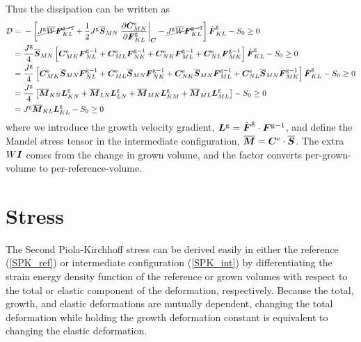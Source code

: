 \documentclass[10pt,letterpaper,oneside]{report}
\newcommand{\ten}[1]{\mbox{\boldmath $#1$}{}}
\newcommand{\scas}[1]{\mbox{{\scriptsize{${\rm{#1}}$}}}{}}
\newcommand{\tens}[1]{\mbox{\boldmath{\scriptsize{$#1$}}}{}}
\begin{document}
Thus the dissipation can be written as 
\begin{align}
\mathcal{D} 
={}& - \left[ 
  \cancel{J^{\scas{g}} \overline{W} \ten{F}^{\scas{g}-1}_{KL}}
+ \frac{1}{2} J^{\scas{g}} \overline{\ten{S}}_{MN} \left. \frac{ \partial \ten{C}^{\scas{e}}_{MN} }{\partial \ten{F}^{\scas{g}}_{KL} } \right|_{\tens{C}} 
- \cancel{J^{\scas{g}} \overline{W} \ten{F}^{\scas{g}-1}_{KL}}
\right] \dot{\ten{F}}^{\scas{g}}_{KL} - S_0 \geq 0
\notag \\
={}& \frac{J^{\scas{g}}}{4} \overline{\ten{S}}_{MN} \left[ \ten{C}^{\scas{e}}_{MK} \ten{F}^{\scas{g}-1}_{NL} + \ten{C}^{\scas{e}}_{ML} \ten{F}^{\scas{g}-1}_{NK} + \ten{C}^{\scas{e}}_{NK} \ten{F}^{\scas{g}-1}_{ML} + \ten{C}^{\scas{e}}_{NL} \ten{F}^{\scas{g}-1}_{MK} 
\right] \dot{\ten{F}}^{\scas{g}}_{KL} - S_0 \geq 0
\notag \\
={}& \frac{J^{\scas{g}} }{4} \left[ 
  \ten{C}^{\scas{e}}_{MK} \overline{\ten{S}}_{MN} \ten{F}^{\scas{g}-1}_{NL} 
+ \ten{C}^{\scas{e}}_{ML} \overline{\ten{S}}_{MN} \ten{F}^{\scas{g}-1}_{NK} 
+ \ten{C}^{\scas{e}}_{NK} \overline{\ten{S}}_{MN} \ten{F}^{\scas{g}-1}_{ML} 
+ \ten{C}^{\scas{e}}_{NL} \overline{\ten{S}}_{MN} \ten{F}^{\scas{g}-1}_{MK} 
\right] \dot{\ten{F}}^{\scas{g}}_{KL} - S_0 \geq 0
\notag \\
={}& \frac{J^{\scas{g}} }{4} \left[ 
  \overline{\ten{M}}_{KN} \ten{L}^{\scas{g}}_{KN}  
+ \overline{\ten{M}}_{LN} \ten{L}^{\scas{g}}_{LN}  
+ \overline{\ten{M}}_{MK} \ten{L}^{\scas{g}}_{KM}  
+ \overline{\ten{M}}_{ML} \ten{L}^{\scas{g}}_{ML}  
\right] - S_0 \geq 0
\notag \\
={}& J^{\scas{g}} \overline{\ten{M}}_{KL} 
\ten{L}^{\scas{g}}_{KL} - S_0 \geq 0
\end{align}
where we introduce the growth velocity gradient, $\ten{L}^{\scas{g}} = \dot{\ten{F}}^{\scas{g}} \cdot \ten{F}^{\scas{g}-1}$, and define the Mandel stress tensor in the intermediate configuration, $\overline{\ten{M}} = \ten{C}^{\scas{e}} \cdot \overline{\ten{S}} $.
The extra $W \ten{I}$ comes from the change in grown volume, and the factor converts per-grown-volume to per-reference-volume.

\section{Stress}
The Second Piola-Kirchhoff stress can be derived easily in either the reference (\autoref{SPK_ref}) or intermediate configuration (\autoref{SPK_int}) by differentiating the strain energy density function of the reference or grown volumes with respect to the total or elastic component of the deformation, respectively.  Because the total, growth, and elastic deformations are mutually dependent, changing the total deformation while holding the growth deformation constant is equivalent to changing the elastic deformation.  
\end{document}

